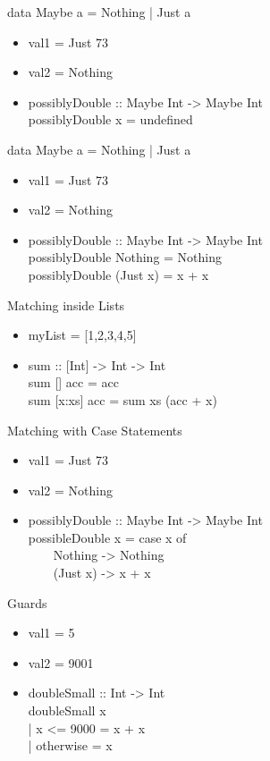 \documentclass{beamer}                  %
\newcommand{\srule}{
	\rule{\textwidth}{1pt}\\
}
\newlength{\subsecwidth}
\newenvironment{slide}{
	\begin{frame} %
	\settowidth{\subsecwidth}{\insertsubsection} %
	\ifthenelse{\dimtest{\subsecwidth}{<}{1pt}}{ %
		\frametitle{\insertsection\\             %
		\vspace{-1ex}                            %
		\color{fore}\srule                       %
		\par                                     %
		\vspace{-3ex}                            %
		}
	}{                                           %
		\frametitle{\insertsection\ -- \insertsubsection\\ %
		\vspace{-1ex}                            %
		\color{fore}\srule                       %
		\par                                     %
		\vspace{-3ex}                            %
		}
	}
	\Large                                       %
}{
	\end{frame}
}
\begin{document}
\begin{slide}
  data Maybe a = Nothing | Just a
  \begin{itemize}
    \item val1 = Just 73
    \item val2 = Nothing
    \item possiblyDouble :: Maybe Int -> Maybe Int\\
      possiblyDouble x = undefined
  \end{itemize}
\end{slide}

\begin{slide}
  data Maybe a = Nothing | Just a
  \begin{itemize}
    \item val1 = Just 73
    \item val2 = Nothing
    \item possiblyDouble :: Maybe Int -> Maybe Int\\
      possiblyDouble Nothing = Nothing\\
      possiblyDouble (Just x) = x + x
  \end{itemize}
\end{slide}

\begin{slide}
  Matching inside Lists
  \begin{itemize}
    \item myList = [1,2,3,4,5]
    \item sum :: [Int] -> Int -> Int\\
          sum [] acc     = acc\\
          sum [x:xs] acc = sum xs (acc + x)
  \end{itemize}
\end{slide}

\begin{slide}
  Matching with Case Statements
  \begin{itemize}
    \item val1 = Just 73
    \item val2 = Nothing
    \item possiblyDouble :: Maybe Int -> Maybe Int\\
      possibleDouble x = case x of\\
      ~~~~Nothing -> Nothing\\
      ~~~~(Just x) -> x + x
  \end{itemize}
\end{slide}

\begin{slide}
  Guards
  \begin{itemize}
    \item val1 = 5
    \item val2 = 9001
    \item doubleSmall :: Int -> Int\\
      doubleSmall x\\
      | x <= 9000 = x + x\\
      | otherwise = x
  \end{itemize}
\end{slide}
\end{document}
